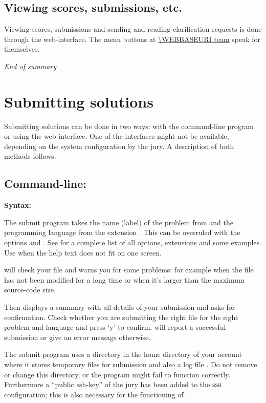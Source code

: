 \subsection*{Viewing scores, submissions, etc.}

Viewing scores, submissions and sending and reading clarification
requests is done through the web-interface. The menu buttons at
\url{\WEBBASEURI team} speak for themselves.

\emph{End of summary}

\newpage

\section{Submitting solutions}\label{submit}

Submitting solutions can be done in two ways: with the command-line
program  or using the web-interface. One of the
interfaces might not be available, depending on the system
configuration by the jury. A description of both methods follows.

\subsection{Command-line: }

\textbf{Syntax:} 

The submit program takes the name (label) of the problem from
 and the programming language from the extension
. This can be overruled with the options
 and .
See  for a complete list of all options,
extensions and some examples.  Use 
when the help text does not fit on one screen.

 will check your file and warns you for some problems:
for example when the file has not been modified for a long time or
when it's larger than the maximum source-code size.

Then  displays a summary with all details of your
submission and asks for confirmation. Check whether you are submitting
the right file for the right problem and language and press `y' to
confirm.  will report a successful submission or give
an error message otherwise.

The submit program uses a directory \cmd{\USERSUBMITDIR} in the
home directory of your account where it stores temporary files for
submission and also a log file . Do not remove or
change this directory, or the  program might fail to
function correctly. Furthermore a ``public ssh-key'' of the jury has
been added to the \textsc{ssh} configuration; this is also necessary
for the functioning of .

